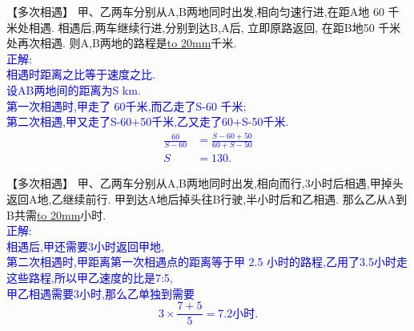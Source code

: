 \item {
    【多次相遇】
    甲、乙两车分别从A,B两地同时出发,相向匀速行进,在距A地 60 千米处相遇. 相遇后,两车继续行进,分别到达B,A后, 立即原路返回, 在距B地50 千米处再次相遇. 则A,B两地的路程是\underline{\hbox to 20mm{}}千米. 
    \ifshowSolution 
        \fangsong{}\textcolor{blue}{
            \\正解: \\
            相遇时距离之比等于速度之比.\\
            设AB两地间的距离为S km.\\
            第一次相遇时,甲走了 60千米,而乙走了S-60 千米; \\
            第二次相遇,甲又走了S-60+50千米,乙又走了60+S-50千米.\\
            \begin{align*}
                \frac{60}{S-60} &= \frac{S-60+50}{60+S-50} \\
                S&=130.
            \end{align*}
        }
    \else
        \vspace{2cm}
    \fi
}

\item {
    【多次相遇】
    甲、乙两车分别从A,B两地同时出发,相向而行,3小时后相遇,甲掉头返回A地,乙继续前行. 甲到达A地后掉头往B行驶,半小时后和乙相遇. 那么乙从A到B共需\underline{\hbox to 20mm{}}小时.
    \ifshowSolution 
        \fangsong{}\textcolor{blue}{
            \\正解:\\ 
                相遇后,甲还需要3小时返回甲地,\\
                第二次相遇时,甲距离第一次相遇点的距离等于甲 2.5 小时的路程,乙用了3.5小时走这些路程,所以甲乙速度的比是7:5,\\
                甲乙相遇需要3小时,那么乙单独到需要
                \[ 3\times \frac{7+5}{5} = 7.2小时.\]
        }
    \else
        \vspace{2cm}
    \fi
}

